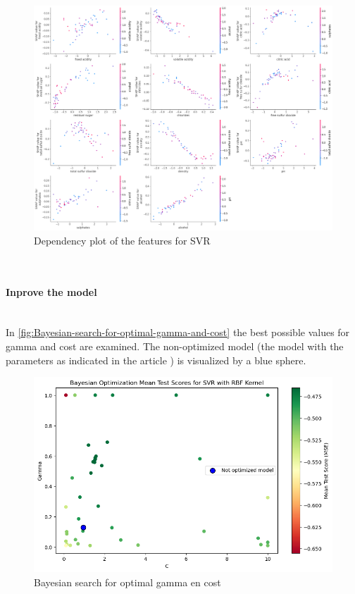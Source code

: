 \documentclass{article}
\newcommand{\subsubsubsection}[1]{%
  \paragraph{#1}\mbox{}\\}
\begin{document}
\begin{figure}
    \centering
    \includegraphics[width=\linewidth]{figures/shap-dependency-svr.png}
    \caption{Dependency plot of the features for SVR}
    \label{fig:dependency-plot-svr}
\end{figure}

\subsubsubsection{Inprove the model}

In \autoref{fig:Bayesian-search-for-optimal-gamma-and-cost} the best possible values for gamma and cost are examined. The non-optimized model (the model with the parameters as indicated in the article \cite{dahal2021prediction} ) is visualized by a blue sphere.
\begin{figure}
    \centering
    \includegraphics[width=\linewidth]{figures/bayesian_optimization.png}
    \caption{Bayesian search for optimal gamma en cost}
    \label{fig:Bayesian-search-for-optimal-gamma-and-cost}
\end{figure}
\end{document}
